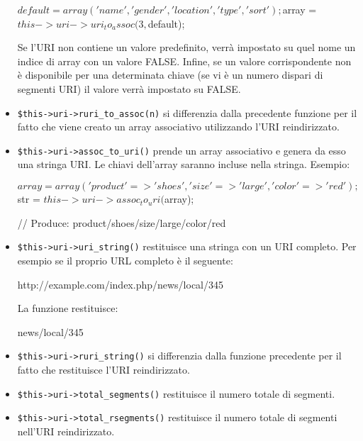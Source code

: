 \begin{itemize}
\begin{code}
$default = array('name', 'gender', 'location', 'type', 'sort');

$array = $this->uri->uri_to_assoc(3, $default);
\end{code}

Se l'\ac{URI} non contiene un valore predefinito, verrà impostato su quel nome un indice di array con un valore FALSE. Infine, se un valore corrispondente non è disponibile per una determinata chiave (se vi è un numero dispari di segmenti \ac{URI}) il valore verrà impostato su FALSE.

\item \verb|$this->uri->ruri_to_assoc(n)| si differenzia dalla precedente funzione per il fatto che viene creato un array associativo utilizzando l'URI reindirizzato.

\item \verb|$this->uri->assoc_to_uri()| prende un array associativo e genera da esso una stringa URI. Le chiavi dell'array saranno incluse nella stringa. Esempio:

\begin{code}
$array = array('product' => 'shoes', 'size' => 'large', 'color' => 'red');

$str = $this->uri->assoc_to_uri($array);

// Produce: product/shoes/size/large/color/red
\end{code}

\item \verb|$this->uri->uri_string()| restituisce una stringa con un URI completo. Per esempio se il proprio URL completo è il seguente:

\begin{code}
http://example.com/index.php/news/local/345
\end{code}

La funzione restituisce:

\begin{code}
news/local/345
\end{code}

\item \verb|$this->uri->ruri_string()| si differenzia dalla funzione precedente per il fatto che restituisce l'URI reindirizzato.

\item \verb|$this->uri->total_segments()| restituisce il numero totale di segmenti.

\item \verb|$this->uri->total_rsegments()| restituisce il numero totale di segmenti nell'URI reindirizzato.


\end{itemize}
